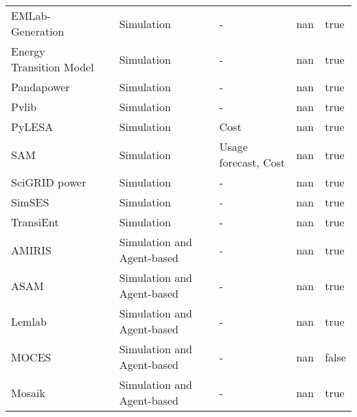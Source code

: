 \begin{tabular}{llllrl}
EMLab-Generation  &  \cite{richstein_cross-border_2014}  &  Simulation   &  -  & nan &  true   \\
Energy Transition Model  &  \cite{quintel_etm_2022}  &  Simulation   &  -  & nan &  true   \\
Pandapower   &  \cite{thurner_pandapower_2018}  &  Simulation   &  -  & nan &  true   \\
Pvlib   &  \cite{holmgren_pvlib_2018}  &  Simulation   &  -  & nan &  true   \\
PyLESA   &  \cite{lyden_pylesa_2021}  &  Simulation   &  Cost  & nan &  true   \\
SAM  &  \cite{blair_system_2014}  &  Simulation   &  Usage forecast, Cost  & nan &  true   \\
SciGRID power  &  \cite{matke_structure_2017}  &  Simulation   &  -  & nan &  true   \\
SimSES   &  \cite{naumann_simses_2017}  &  Simulation   &  -  & nan &  true   \\
TransiEnt   &  \cite{andresen_status_2015}  &  Simulation   &  -  & nan &  true   \\
AMIRIS   &  \cite{nitsch_economic_2021}  &  Simulation  and Agent-based   &  -  & nan &  true   \\
ASAM   &  \cite{glismann_ancillary_2021}  &  Simulation  and Agent-based   &  -  & nan &  true   \\
Lemlab   &  \cite{zade_satisfying_2022}  &  Simulation  and Agent-based   &  -  & nan &  true   \\
MOCES   &  \cite{exel_multi-domain_2015}  &  Simulation  and Agent-based   &  -  & nan &  false   \\
Mosaik   &  \cite{ofenloch_mosaik_2022}  &  Simulation  and Agent-based   &  -  & nan &  true   \\
\bottomrule
\end{tabular}
